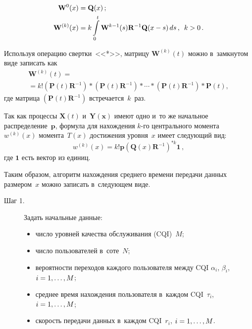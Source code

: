 \begin{multicols}{2}
\noindent
\begin{align*}
\mathbf{W}^{0}(x) &=\mathbf{Q}(x)\,;\\
\mathbf{W}^{(k)} (x)&=  k\int\limits_0^t \mathbf{W}^{k-1}(s) 
\mathbf{R}^{-1} \mathbf{Q}(x-s)\,ds\,,\enskip k>0\,.
\end{align*}
  
  Используя операцию свертки~<<*>>, матрицу $\mathbf{W}^{(k)}(t)$ можно 
в~замкнутом виде записать как
  \begin{multline*}
  \mathbf{W}^{(k)}(t)={}\\
  {}=k! \left( \mathbf{P}(t) \mathbf{R}^{-1}\right) * \left( 
\mathbf{P}(t) \mathbf{R}^{-1}\right) * \cdots * \left( \mathbf{P}(t)\mathbf{R}^{-1} 
\right)  * \mathbf{P}(t),
  \end{multline*}
где матрица $(\mathbf{P}(t)\mathbf{R}^{-1})$ встречается~$k$~раз. 

Так как процессы $\mathbf{X}(t)$ и~$\mathbf{Y}(\mathbf{x})$ имеют одно и~то 
же начальное распределение~$\mathbf{p}$, формула для нахождения $k$-го 
центрального момента $w^{(k)}(x)$ момента~$T(x)$ достижения уровня~$x$ 
имеет следующий вид:
\begin{equation*}
w^{(k)}(x)=k! \mathbf{p}\left( \mathbf{Q}(x) \mathbf{R}^{-
1}\right)^{*k}\mathbf{1}\,,
\end{equation*}
где $\mathbf{1}$ есть вектор из единиц.

Таким образом, алгоритм нахождения среднего времени передачи данных 
размером~$x$ можно записать в~следующем виде.
\begin{description}
\item[Шаг 1.] Задать начальные данные: 
\begin{itemize}
\item число уровней качества обслуживания (CQI)~$M$;

\item число пользователей в~соте~$N$;

\item вероятности переходов каж\-до\-го пользователя между CQI $\alpha_i$, 
$\beta_i$, $i\hm=1,\ldots ,M$;

\item среднее время нахождения пользователя в~каж\-дом CQI~$\tau_i$, 
$i\hm=1,\ldots ,M$;

\item скорость передачи данных в~каж\-дом CQI~$r_i$, $i\hm=1,\ldots , M$.
\end{itemize}


\end{description}
\end{multicols}
